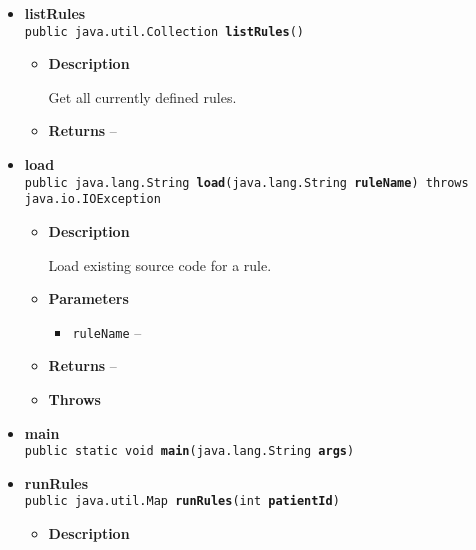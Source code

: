 {{{{\begin{itemize}
{\begin{itemize}
{Get an instance of the DSSRuleService
}
\item{{\bf  Returns} -- 
 
}%
\end{itemize}
}%
\item{ 
\hypertarget{org.openmrs.module.dssmodule.DSSRuleService.listRules()}{{\bf  listRules}\\}
\texttt{public java.util.Collection\ {\bf  listRules}()
\label{org.openmrs.module.dssmodule.DSSRuleService.listRules()}}%
\begin{itemize}
\item{
{\bf  Description}

Get all currently defined rules.
}
\item{{\bf  Returns} -- 
 
}%
\end{itemize}
}%
\item{ 
\hypertarget{org.openmrs.module.dssmodule.DSSRuleService.load(java.lang.String)}{{\bf  load}\\}
\texttt{public java.lang.String\ {\bf  load}(\texttt{java.lang.String} {\bf  ruleName}) throws java.io.IOException
\label{org.openmrs.module.dssmodule.DSSRuleService.load(java.lang.String)}}%
\begin{itemize}
\item{
{\bf  Description}

Load existing source code for a rule.
}
\item{
{\bf  Parameters}
  \begin{itemize}
   \item{
\texttt{ruleName} -- }
  \end{itemize}
}%
\item{{\bf  Returns} -- 
 
}%
\item{{\bf  Throws}
}%
\end{itemize}
}%
\item{ 
\hypertarget{org.openmrs.module.dssmodule.DSSRuleService.main(java.lang.String[])}{{\bf  main}\\}
\texttt{public static void\ {\bf  main}(\texttt{java.lang.String\lbrack \rbrack } {\bf  args})
\label{org.openmrs.module.dssmodule.DSSRuleService.main(java.lang.String[])}}%
}%
\item{ 
\hypertarget{org.openmrs.module.dssmodule.DSSRuleService.runRules(int)}{{\bf  runRules}\\}
\texttt{public java.util.Map\ {\bf  runRules}(\texttt{int} {\bf  patientId})
\label{org.openmrs.module.dssmodule.DSSRuleService.runRules(int)}}%
\begin{itemize}
\item{
{\bf  Description}

}
\end{itemize}}
\end{itemize}}}}}
